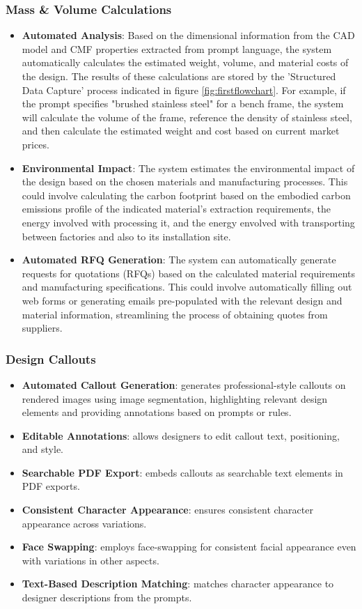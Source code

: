 \documentclass[12pt]{article}
\begin{document}
\subsubsection{Mass \& Volume Calculations}
\begin{itemize}
\item \textbf{Automated Analysis}: Based on the dimensional information from the CAD model and CMF properties extracted from prompt language, the system automatically calculates the estimated weight, volume, and material costs of the design. The results of these calculations are stored by the 'Structured Data Capture' process indicated in figure \ref{fig:firstflowchart}. For example, if the prompt specifies "brushed stainless steel" for a bench frame, the system will calculate the volume of the frame, reference the density of stainless steel, and then calculate the estimated weight and cost based on current market prices.
\item \textbf{Environmental Impact}: The system estimates the environmental impact of the design based on the chosen materials and manufacturing processes. This could involve calculating the carbon footprint based on the embodied carbon emissions profile of the indicated material's extraction requirements, the energy involved with processing it, and the energy envolved with transporting between factories and also to its installation site. 
\item \textbf{Automated RFQ Generation}: The system can automatically generate requests for quotations (RFQs) based on the calculated material requirements and manufacturing specifications. This could involve automatically filling out web forms or generating emails pre-populated with the relevant design and material information, streamlining the process of obtaining quotes from suppliers.
\end{itemize}

\subsubsection{Design Callouts}
\begin{itemize}
    \item \textbf{Automated Callout Generation}: generates professional-style callouts on rendered images using image segmentation, highlighting relevant design elements and providing annotations based on prompts or rules. 
    \item \textbf{Editable Annotations}: allows designers to edit callout text, positioning, and style.
    \item \textbf{Searchable PDF Export}: embeds callouts as searchable text elements in PDF exports.
    \item \textbf{Consistent Character Appearance}: ensures consistent character appearance across variations.
    \item \textbf{Face Swapping}: employs face-swapping for consistent facial appearance even with variations in other aspects.
    \item \textbf{Text-Based Description Matching}: matches character appearance to designer descriptions from the prompts.
\end{itemize}
\end{document}
